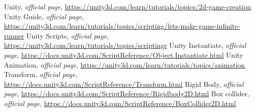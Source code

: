 \begin{thebibliography}{99999}
\singlespace\normalsize

 Unity, \textit{ official page}, \url{https://unity3d.com/learn/tutorials/topics/2d-game-creation}
 Unity Guide, \textit{ official page}, \url{https://unity3d.com/learn/tutorials/topics/scripting/lets-make-game-infinite-runner}
 Unity Scripts, \textit{ official page}, \url{https://unity3d.com/learn/tutorials/topics/scriptingr}
 Unity Instantiate, \textit{ official page}, \url{https://docs.unity3d.com/ScriptReference/Object.Instantiate.html}
 Unity Animation, \textit{ official page}, \url{https://unity3d.com/learn/tutorials/topics/animation}
 Transform, \textit{ official page}, \url{https://docs.unity3d.com/ScriptReference/Transform.html}
 Rigid Body, \textit{ official page}, \url{https://docs.unity3d.com/ScriptReference/Rigidbody2D.html}
 Box collider, \textit{ official page}, \url{https://docs.unity3d.com/ScriptReference/BoxCollider2D.html}


\end{thebibliography}
